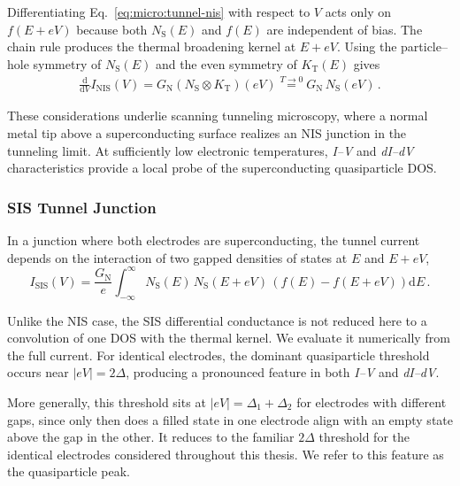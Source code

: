             Differentiating Eq.~\eqref{eq:micro:tunnel-nis} with respect to $V$ acts only on $f(E+eV)$ because both $N_{\mathrm{S}}(E)$ and $f(E)$ are independent of bias. The chain rule produces the thermal broadening kernel at $E+eV$. Using the particle--hole symmetry of $N_\mathrm{S}(E)$ and the even symmetry of $K_\mathrm{T}(E)$ gives
            \begin{align}
                \tfrac{\mathrm{d}}{\mathrm{d}V}I_\mathrm{NIS}(V) = G_\mathrm{N} \left( N_\mathrm{S} \otimes K_\mathrm{T}\right)(eV) \overset{T\to 0}{=} G_\mathrm{N}\,N_\mathrm{S}(eV)\,.
            \end{align}

            These considerations underlie scanning tunneling microscopy, where a normal metal tip above a superconducting surface realizes an NIS junction in the tunneling limit. At sufficiently low electronic temperatures, \textit{I--V} and \textit{dI--dV} characteristics provide a local probe of the superconducting quasiparticle DOS.

        \subsubsection*{SIS Tunnel Junction}

            In a junction where both electrodes are superconducting, the tunnel current depends on the interaction of two gapped densities of states at $E$ and $E+eV$,
            \begin{equation}
                I_\mathrm{SIS}(V)
                    = \frac{G_\mathrm{N}}{e}
                    \int_{-\infty}^{\infty}
                        N_\mathrm{S}(E)\,
                        N_\mathrm{S}(E+eV)\,
                        \left(f(E) - f(E+eV)\right)
                    \mathrm{d}E\,.
                \label{eq:micro:tunnel-sis}
            \end{equation}

            Unlike the NIS case, the SIS differential conductance is not reduced here to a convolution of one DOS with the thermal kernel. We evaluate it numerically from the full current. For identical electrodes, the dominant quasiparticle threshold occurs near $|eV|=2\Delta$, producing a pronounced feature in both \textit{I--V} and \textit{dI--dV}.

            More generally, this threshold sits at $|eV|=\Delta_1+\Delta_2$ for electrodes with different gaps, since only then does a filled state in one electrode align with an empty state above the gap in the other. It reduces to the familiar $2\Delta$ threshold for the identical electrodes considered throughout this thesis. We refer to this feature as the quasiparticle peak.

